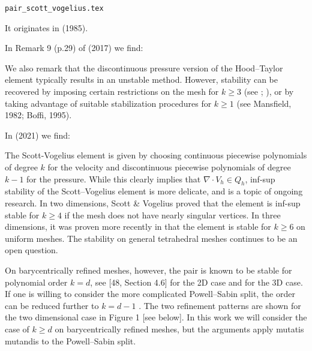 \begin{flushright} {\tiny {\color{gray} \tt pair\_scott\_vogelius.tex}} \end{flushright}

It originates in  (1985). 

 
In Remark 9 (p.29) of \textcite{aubb17} (2017) we find: 
\begin{displayquote}
{\color{darkgray}
We also remark that the discontinuous
pressure version of the Hood–Taylor element typically
results in an unstable method. However, stability can be
recovered by imposing certain restrictions on the mesh for
$k \ge 3$ (see \cite{voge83}; \cite{scvo85}), or
by taking advantage of suitable stabilization procedures for
$k\ge 1$ (see Mansfield, 1982; Boffi, 1995).
}
\end{displayquote}

In \textcite{fams21} (2021) we find:
\begin{displayquote}
{\color{darkgray}
The Scott-Vogelius element is given by choosing continuous piecewise 
polynomials of degree $k$ for the velocity and discontinuous piecewise 
polynomials of degree $k-1$ for the pressure. While this clearly
implies that $\nabla\cdot V_h \in Q_h$, inf-sup stability of the 
Scott–Vogelius element is more delicate, and is a topic of ongoing research. 
In two dimensions, Scott \& Vogelius proved \cite{scvo85} that the element is inf-sup
stable for $k\ge 4$ if the mesh does not have nearly singular vertices. 
In three dimensions, it was proven more recently in \cite{zhan11b} 
that the element is stable for $k\ge 6$ on uniform meshes. The stability on general
tetrahedral meshes continues to be an open question.

On barycentrically refined meshes, however, the pair is known to 
be stable for polynomial order
$k = d$, see [48, Section 4.6] for the 2D case and 
\cite{zhan05} for the 3D case. If one is willing to 
consider the more complicated Powell–Sabin split, the order 
can be reduced further to $k=d-1$ \cite{zhan08,zhan11a}. The two
refinement patterns are shown for the two dimensional case 
in Figure 1 [see below]. In this work we will consider
the case of $k \ge d$ on barycentrically refined meshes, but 
the arguments apply mutatis mutandis to the Powell–Sabin split.
}
\end{displayquote}

